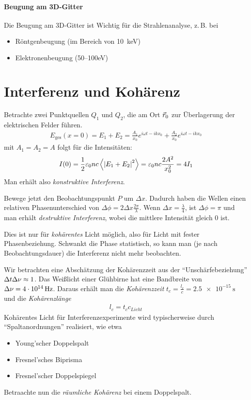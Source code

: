 \paragraph{Beugung am 3D-Gitter}
Die Beugung am 3D-Gitter ist Wichtig für die Strahlenanalyse, z.\,B. bei
\begin{itemize}
\item Röntgenbeugung (im Bereich von \SI{10}{\kilo\eV})
\item Elektronenbeugung (50–100\si{\eV})
\end{itemize}


\section{Interferenz und Kohärenz}
Betrachte zwei Punktquellen $Q_1$ und $Q_2$, die am Ort $\vec{r}_0$ zur
Überlagerung der elektrischen Felder führen. 
\begin{align*}
  E_\text{ges}(x=0) 
  = E_1+E_2
  =\frac{A_1}{x_0}e^{i\omega t-ikx_0} + \frac{A_2}{x_0}e^{i\omega t- ikx_0}
\end{align*}
mit $A_1=A_2=A$ folgt für die Intensitäten:
\begin{align*}
  I(0)
  = \frac{1}{2}\varepsilon_0 nc\left\langle\left|E_1 + E_2\right|^2\right\rangle 
  = \varepsilon_0 nc\frac{2A^2}{x_0^2}
  = 4I_1
\end{align*}
Man erhält also \emph{konstruktive Interferenz}.

Bewege jetzt den Beobachtungspunkt $P$ um $\Delta x$. 
Dadurch haben die Wellen einen relativen Phasenunterschied von
$\Delta\phi = 2\Delta x\frac{2\pi}{\lambda}$.
Wenn $\Delta x=\frac{\lambda}{4}$, ist $\Delta\phi=\pi$ und man erhält
\emph{destruktive Interferenz}, wobei die mittlere Intensität gleich 0
ist.

 Dies ist nur für \emph{kohärentes} Licht möglich, also
für Licht mit fester Phasenbeziehung. Schwankt die Phase statistisch,
so kann man (je nach Beobachtungsdauer) die Interferenz nicht mehr
beobachten.

Wir betrachten eine Abschätzung der Kohärenzzeit aus der
\enquote{Unschärfebeziehung} $\Delta t\Delta\nu\approx1$.
Das Weißlicht einer Glühbirne hat eine Bandbreite von
$\Delta\nu=\SI{4e14}{\hertz}$. Daraus erhält man die \emph{Kohärenzzeit}
$t_c=\frac{l_c}{c}=\SI{2,5e-15}{\second}$ und die
\emph{Kohärenzlänge}
\begin{align*}
  l_c=t_c c_{Licht}
\end{align*}
Kohärentes Licht für Interferenzexperimente wird typischerweise durch
\enquote{Spaltanordnungen} realisiert, wie etwa
\begin{itemize}
\item Young'scher Doppelspalt
\item Fresnel'sches Biprisma
\item Fresnel'scher Doppelspiegel
\end{itemize}
Betraachte nun die \emph{räumliche Kohärenz} bei einem Doppelspalt.

